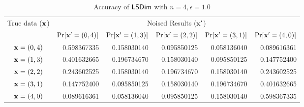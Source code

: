 \documentclass{article}
\begin{document}
\begin{table}[htbp]
	\scriptsize
	\centering
	\caption{Accuracy of $\mathsf{LSDim}$ with $n = 4, \epsilon = 1.0$}
	\label{tab_n4eps1prob_lap}
\begin{tabular}{|c||r|r|r|r|r|}
	\hline

	\multirow{2}{*}{True data ($\textbf{x}$)}
								& \multicolumn{5}{c|}{Noised Results ($\textbf{x}'$)}  
								\\ \cline{2-6}
	                      		&  $\Pr[\textbf{x}' = (0, 4)]$  	
	                      		&  $\Pr[\textbf{x}' = (1, 3)]$ 	
	                      		&  $\Pr[\textbf{x}' = (2, 2)]$ 	
	                      		&  $\Pr[\textbf{x}' = (3, 1)]$ 	
	                      		&  $\Pr[\textbf{x}' = (4, 0)]$ 	
	                      		\\  \hline
	                      		\hline
	$\textbf{x} = (0,4)$          & 0.598367335
								& 0.158030140	
								& 0.095850125
								& 0.058136040
								& 0.089616361
								\\  \hline
	$\textbf{x} = (1,3)$          & 0.401632665
								& 0.196734670
								& 0.158030140
								& 0.095850125
								& 0.147752400
								\\  \hline
	$\textbf{x} = (2,2)$          & 0.243602525
								& 0.158030140
								& 0.196734670
								& 0.158030140
								& 0.243602525
								\\  \hline
	$\textbf{x} = (3,1)$          & 0.147752400
								& 0.095850125
								& 0.158030140
								& 0.196734670
								& 0.401632665
								\\  \hline
	$\textbf{x} = (4,0)$          & 0.089616361
								& 0.058136040
								& 0.095850125
								& 0.158030140
								& 0.598367335
								\\  \hline
\end{tabular}
\vspace{-0.5cm}
\end{table}
\end{document}
